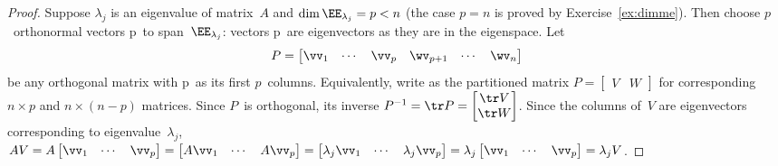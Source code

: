 \begin{proof} 
Suppose \(\lambda_j\) is an eigenvalue of matrix~\(A\) and \(\dim\EE_{\lambda_j}=p<n\) (the case \(p=n\) is proved by Exercise~\ref{ex:dimme}).
Then choose \(p\)~orthonormal vectors \hlist\vv p\ to span~\(\EE_{\lambda_j}\): vectors \hlist\vv p\ are eigenvectors as they are in the eigenspace.
Let
\begin{equation*}
P=\begin{bmatrix} \vv_1&\cdots&\vv_p&\wv_{p+1}&\cdots&\wv_n \end{bmatrix}
\end{equation*}
be any orthogonal matrix with \hlist\vv p\ as its first \(p\)~columns.
Equivalently, write as the partitioned matrix \(P=\begin{bmatrix} V&W \end{bmatrix}\) for corresponding \(n\times p\) and \(n\times(n-p)\) matrices.
Since \(P\)~is orthogonal, its inverse \(P^{-1}=\tr P=\begin{bmatrix} \tr V\\\tr W \end{bmatrix}\).
Since the columns of~\(V\) are eigenvectors corresponding to eigenvalue~\(\lambda_j\), \(AV=A\begin{bmatrix} \vv_1&\cdots&\vv_p \end{bmatrix}
=\begin{bmatrix} A\vv_1&\cdots&A\vv_p \end{bmatrix}
=\begin{bmatrix} \lambda_j\vv_1&\cdots&\lambda_j\vv_p \end{bmatrix}
=\lambda_j\begin{bmatrix} \vv_1&\cdots&\vv_p \end{bmatrix}
=\lambda_jV\).


\end{proof}

